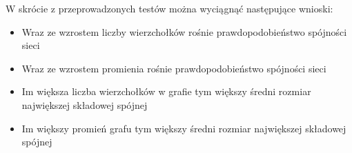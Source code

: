 	W skrócie z przeprowadzonych testów można wyciągnąć następujące wnioski:
	\begin{itemize}
		\item Wraz ze wzrostem liczby wierzchołków rośnie prawdopodobieństwo spójności sieci
		\item Wraz ze wzrostem promienia rośnie prawdopodobieństwo spójności sieci
		\item Im większa liczba wierzchołków w grafie tym większy średni rozmiar największej składowej spójnej
		\item Im większy promień grafu tym większy średni rozmiar największej składowej spójnej	
	\end{itemize}

